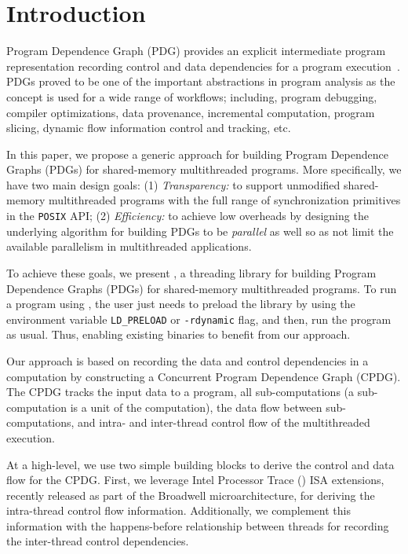 \section{Introduction}
\label{sec:introduction}

Program Dependence Graph (PDG) provides an explicit intermediate program representation recording control and data dependencies for a program execution~\cite{pdg-pingali}. PDGs proved to be one of the important abstractions in program analysis as the concept is used for a wide range of workflows; including, program debugging, compiler optimizations, data provenance, incremental computation, program slicing, dynamic flow information control and tracking,  etc.


In this paper, we propose a generic approach for building Program Dependence Graphs (PDGs)  for shared-memory multithreaded programs. More specifically, we have two main design goals: (1) {\em Transparency:} to support unmodified shared-memory multithreaded programs with the full range of synchronization primitives in the {\tt POSIX} API; (2) {\em Efficiency:} to achieve low overheads by designing the underlying algorithm for building PDGs to be  {\em parallel} as well so as not limit the available parallelism in multithreaded applications.


To achieve these goals, we present \projecttitle, a threading library for building Program Dependence Graphs (PDGs) for shared-memory multithreaded programs. To run a program using \projecttitle,  the user just needs to preload the \projecttitle library  by using the environment variable {\tt LD\_PRELOAD} or {\tt -rdynamic} flag, and then, run the program as usual. Thus, enabling existing binaries to benefit from our approach.


Our approach is based on recording the data and control dependencies in a computation by constructing a Concurrent Program Dependence Graph (CPDG). The CPDG tracks the input data to a program, all sub-computations (a sub-computation is a unit of the computation), the data flow between sub-computations, and intra- and inter-thread control flow of the multithreaded execution.


At a high-level, we use two simple building blocks to derive the control and data flow for the CPDG. First, we leverage Intel Processor Trace (\intelpt) ISA extensions, recently released as part of the Broadwell microarchitecture, for deriving the intra-thread control flow information. Additionally, we complement this  information with the happens-before relationship between threads for recording the inter-thread control dependencies.

